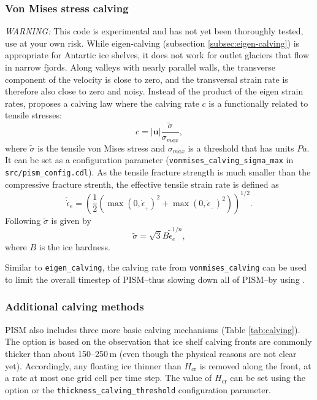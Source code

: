 \subsubsection{Von Mises stress calving}
\label{subsec:stress-calving}

\emph{WARNING:} This code is experimental and has not yet been thoroughly tested, use at your own risk. While eigen-calving (subsection \ref{subsec:eigen-calving}) is appropriate for Antartic ice shelves, it does not work for outlet glaciers that flow in narrow  fjords. Along valleys with nearly parallel walls, the transverse component of the velocity is close to zero, and the transversal strain rate is therefore also close to zero and noisy. Instead of the product of the eigen strain rates, \cite{Morlighem2016} proposes a calving law where the calving rate $c$ is a functionally related to tensile stresses:
\begin{equation}
\label{eq: calv3}
c = |\mathbf{u}| \frac{\tilde{\sigma}}{\sigma_{max}},
\end{equation}
where $\tilde{\sigma}$ is the tensile von Mises stress and $\sigma_{max}$ is a threshold that has units $Pa$. It can be set as a configuration parameter (\texttt{vonmises_calving_sigma_max} in \texttt{src/pism_config.cdl}). As the tensile fracture strength is much smaller than the compressive fracture strenth, the effective tensile strain rate is defined as 
\begin{equation}
\label{eq: calv4}
\tilde{\dot{\epsilon}}_e = \left(\frac{1}{2}\left(\max(0,\dot{\epsilon}_{_+})^2 + \max(0,\dot{\epsilon}_{_-})^2\right)\right)^{1/2}.
\end{equation}
Following \cite{Morlighem2016} $\tilde{\sigma}$ is given by
\begin{equation}
\label{eq: calv5}
\tilde{\sigma} = \sqrt{3} B \tilde{\dot{{\epsilon}}}_e^{1/n},
\end{equation}
where $B$ is the ice hardness.

Similar to \texttt{eigen_calving}, the calving rate from \texttt{vonmises_calving} can be used to limit the overall timestep of PISM--thus slowing down all of PISM--by using .

\subsubsection{Additional calving methods}
\label{subsec:additional-calving}


PISM also includes three more basic calving mechanisms (Table \ref{tab:calving}). The option  is based on the observation that ice shelf calving fronts are commonly thicker than about 150--250\,m (even though the physical reasons are not clear yet). Accordingly, any floating ice thinner than $H_{\textrm{cr}}$ is removed along the front, at a rate at most one grid cell per time step. The value of $H_{\mathrm{cr}}$ can be set using the  option or the \texttt{thickness_calving_threshold} configuration parameter.

